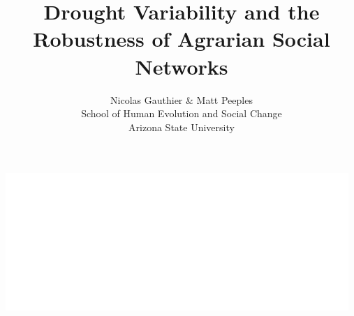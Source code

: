 \documentclass[a0,final]{a0poster}
\title{Drought Variability and the Robustness of Agrarian Social Networks}
\author{Nicolas Gauthier \& Matt Peeples\\
School of Human Evolution and Social Change\\
Arizona State University}
\begin{document}
\hspace{-3cm}								%
\colorbox{boxcol}{							%
\begin{minipage}{1000mm}					%
\maketitle

\end{minipage}
\begin{minipage}[c][10cm][c]{20cm}
    \hfill
    \vfill
    \includegraphics[width=13cm]{images/shesc_vert}
\end{minipage}}
\vspace{1cm}
\end{document}
